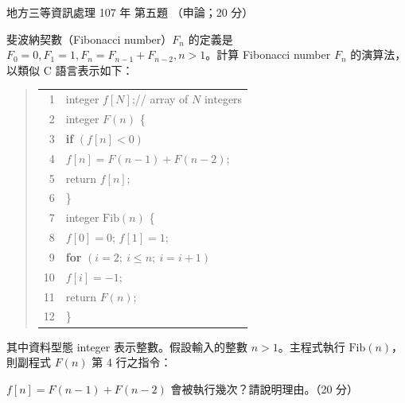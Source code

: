 \begin{pastexam}[label={px:df3-107-ds-05}]{地方三等資訊處理 107 年 第五題}
（申論；20 分）

斐波納契數（Fibonacci number）$F_n$ 的定義是 $F_0 = 0, F_1 = 1, F_n = F_{n-1} + F_{n-2}, n > 1$。計算 Fibonacci number $F_n$ 的演算法，以類似 C 語言表示如下：
\begin{quote}
\begin{tabular}{@{}r@{\qquad}l@{}}
1 & integer $f[N]$;\quad // array of $N$ integers \\
2 & integer $F(n)$ \{ \\
3 & \qquad \textbf{if} $(f[n] < 0)$ \\
4 & \qquad\qquad $f[n] = F(n-1) + F(n-2)$; \\
5 & \qquad return $f[n]$; \\
6 & \} \\
7 & integer $\mathrm{Fib}(n)$ \{ \\
8 & \qquad $f[0] = 0$; $f[1] = 1$; \\
9 & \qquad \textbf{for} $(i = 2;\ i \le n;\ i = i + 1)$ \\
10 & \qquad\qquad $f[i] = -1$; \\
11 & \qquad return $F(n)$; \\
12 & \}
\end{tabular}
\end{quote}
其中資料型態 integer 表示整數。假設輸入的整數 $n > 1$。主程式執行 $\mathrm{Fib}(n)$，則副程式 $F(n)$ 第 4 行之指令：

$f[n] = F(n-1) + F(n-2)$ 會被執行幾次？請說明理由。（20 分）
\end{pastexam}

